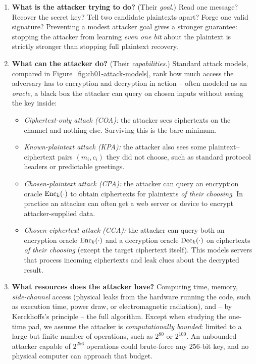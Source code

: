 \begin{enumerate}
  \item \textbf{What is the attacker trying to do?} (Their \emph{goal}.) Read one message? Recover the secret key? Tell two candidate plaintexts apart? Forge one valid signature? Preventing a modest attacker goal gives a stronger guarantee: stopping the attacker from learning \emph{even one bit} about the plaintext is strictly stronger than stopping full plaintext recovery.
  \item \textbf{What can the attacker do?} (Their \emph{capabilities}.) Standard attack models, compared in Figure~\ref{fig:ch01-attack-models}, rank how much access the adversary has to encryption and decryption in action -- often modeled as an \emph{oracle}, a black box the attacker can query on chosen inputs without seeing the key inside:
    \begin{itemize}
      \item \emph{Ciphertext-only attack (COA):} the attacker sees ciphertexts on the channel and nothing else. Surviving this is the bare minimum.
      \item \emph{Known-plaintext attack (KPA):} the attacker also sees some plaintext--ciphertext pairs $(m_i, c_i)$ they did not choose, such as standard protocol headers or predictable greetings.
      \item \emph{Chosen-plaintext attack (CPA):} the attacker can query an encryption oracle $\operatorname{Enc}_k(\cdot)$ to obtain ciphertexts for plaintexts \emph{of their choosing}. In practice an attacker can often get a web server or device to encrypt attacker-supplied data.
      \item \emph{Chosen-ciphertext attack (CCA):} the attacker can query both an encryption oracle $\operatorname{Enc}_k(\cdot)$ and a decryption oracle $\operatorname{Dec}_k(\cdot)$ on ciphertexts \emph{of their choosing} (except the target ciphertext itself). This models servers that process incoming ciphertexts and leak clues about the decrypted result.
    \end{itemize}
  \item \textbf{What resources does the attacker have?} Computing time, memory, \emph{side-channel} access (physical leaks from the hardware running the code, such as execution time, power draw, or electromagnetic radiation), and -- by Kerckhoffs's principle -- the full algorithm. Except when studying the one-time pad, we assume the attacker is \emph{computationally bounded}: limited to a large but finite number of operations, such as $2^{80}$ or $2^{100}$. An unbounded attacker capable of $2^{256}$ operations could brute-force any $256$-bit key, and no physical computer can approach that budget.
\end{enumerate}

